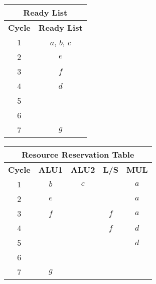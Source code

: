 \begin{examplebox}
    \highspace
    \begin{minipage}{0.35\textwidth}
        \centering
        \begin{tabular}{@{} c | c @{}}
            \toprule
            \multicolumn{2}{c}{Ready List} \\
            \midrule
            \textbf{Cycle} & \textbf{Ready List} \\
            \midrule
            1 & $a$, $b$, $c$ \\
            2 & $e$ \\
            3 & $f$ \\
            4 & $d$ \\
            5 & \\
            6 & \\
            7 & $g$ \\
            \bottomrule
        \end{tabular}
    \end{minipage}
    \hfill
    \begin{minipage}{0.6\textwidth}
        \centering
        \begin{tabular}{@{} c | c | c | c | c @{}}
            \toprule
            \multicolumn{5}{c}{Resource Reservation Table} \\
            \midrule
            \textbf{Cycle} & \textbf{ALU1} & \textbf{ALU2} & \textbf{L/S} & \textbf{MUL} \\
            \midrule
            1 & $b$ & $c$ &     & $a$ \\
            2 & $e$ &   &     & $a$ \\
            3 & $f$ &   & $f$   & $a$ \\
            4 & &   & $f$   & $d$ \\
            5 & &   &     & $d$ \\
            6 & &   &     &   \\
            7 & $g$ &   &     &   \\
            \bottomrule
        \end{tabular}
    \end{minipage}
\end{examplebox}